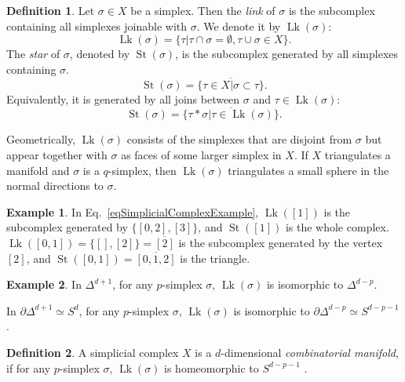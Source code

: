 \documentclass[reprint, amsmath, amssymb, showpacs, floatfix, longbibliography, aps, twocolumn, superscriptaddress, nofootinbib]{revtex4-2}
\theoremstyle{definition}
\newtheorem{definition}{Definition}[section]
\newtheorem{example}{Example}[section]
\begin{document}
\begin{definition}
	Let $\sigma\in X$ be a simplex. Then the \textit{link} of $\sigma$ is the subcomplex containing all simplexes joinable with $\sigma$. We denote it by $\operatorname{Lk}(\sigma)$:
	\begin{equation}
		\operatorname{Lk}(\sigma)=\{\tau|\tau\cap \sigma=\emptyset,\tau\cup\sigma\in X\}.
	\end{equation}
	The \textit{star} of $\sigma$, denoted by $\operatorname{St}(\sigma)$, is the subcomplex generated by all simplexes containing $\sigma$.
	\begin{equation}
		\operatorname{St}(\sigma)=\overline{\{\tau\in X|\sigma\subset \tau\}}.
	\end{equation}
	 Equivalently, it is
	generated by all joins between $\sigma$ and $\tau\in \operatorname{Lk}(\sigma)$:
	\begin{equation}
		\operatorname{St}(\sigma)=\overline{\{\tau*\sigma|\tau\in \operatorname{Lk}(\sigma)\}}.
	\end{equation}
	
\end{definition}
Geometrically, $\operatorname{Lk}(\sigma)$ consists of the simplexes that are disjoint from $\sigma$ but appear together with $\sigma$ as faces of some larger simplex in $X$.
If $X$ triangulates a manifold and $\sigma$ is a $q$-simplex, then $\operatorname{Lk}(\sigma)$ triangulates a small sphere in the normal directions to $\sigma$.

\begin{example}
	In Eq.~\eqref{eqSimplicialComplexExample}, $\operatorname{Lk}([1])$ is the subcomplex generated by $\{[0,2],[3]\}$, and  $\operatorname{St}([1])$ is the whole complex. $\operatorname{Lk}([0,1])=\{[],[2]\}=\overline{[2]}$ is the subcomplex generated by the vertex $[2]$, and $\operatorname{St}([0,1])=\overline{[0,1,2]}$ is the triangle.
\end{example}

\begin{example}
	In $\Delta^{d+1}$, for any $p$-simplex $\sigma$, $\operatorname{Lk}(\sigma)$ is isomorphic to $\Delta^{d-p}$.
	
	In $\partial\Delta^{d+1}\simeq S^d$, for any $p$-simplex $\sigma$, $\operatorname{Lk}(\sigma)$ is isomorphic to $\partial\Delta^{d-p}\simeq S^{d-p-1}$.
\end{example}

\begin{definition}\label{defCombinatorialManifold}
	A simplicial complex $X$ is a $d$-dimensional \textit{combinatorial manifold}, if for any $p$-simplex $\sigma$, $\operatorname{Lk}(\sigma)$ is homeomorphic to $S^{d-p-1}$  \cite{CombinationalManifold}.
\end{definition}
\end{document}
